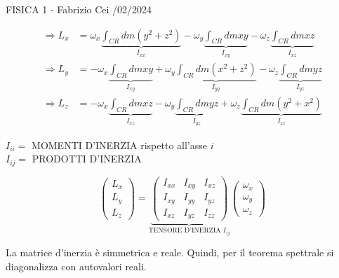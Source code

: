 \documentclass[12pt]{article}
\begin{document}
\begin{flushright}
FISICA 1 - Fabrizio Cei /02/2024
\end{flushright}

\begin{align*}
\Rightarrow L_x &= \omega_x \underbrace{\int_{CR} dm (y^2+z^2)}_{I_{xx}} - \omega_y \underbrace{\int_{CR} dm xy}_{I_{xy}} - \omega_z \underbrace{\int_{CR} dm xz}_{I_{xz}} \\
\Rightarrow L_y &= -\omega_x \underbrace{\int_{CR} dm xy}_{I_{xy}} + \omega_y \underbrace{\int_{CR} dm (x^2+z^2)}_{I_{yy}} - \omega_z \underbrace{\int_{CR} dm yz}_{I_{yz}} \\
\Rightarrow L_z &= -\omega_x \underbrace{\int_{CR} dm xz}_{I_{xz}} - \omega_y \underbrace{\int_{CR} dm yz}_{I_{yz}} + \omega_z \underbrace{\int_{CR} dm (y^2+x^2)}_{I_{zz}}
\end{align*}

$I_{ii} = $ MOMENTI D'INERZIA rispetto all'asse $i$ \\
$I_{ij} = $ PRODOTTI D'INERZIA

\vspace{0.5cm}
\begin{minipage}{0.5\textwidth}
$$
\begin{pmatrix}
L_x \\ L_y \\ L_z
\end{pmatrix}
=
\underbrace{
\begin{pmatrix}
I_{xx} & I_{xy} & I_{xz} \\
I_{xy} & I_{yy} & I_{yz} \\
I_{xz} & I_{yz} & I_{zz}
\end{pmatrix}
}_{\text{TENSORE D'INERZIA } I_{ij}}
\begin{pmatrix}
\omega_x \\ \omega_y \\ \omega_z
\end{pmatrix}
$$
\end{minipage}
\begin{minipage}{0.45\textwidth}
La matrice d'inerzia è simmetrica e reale. Quindi, per il teorema spettrale si diagonalizza con autovalori reali.
\end{minipage}
\end{document}
